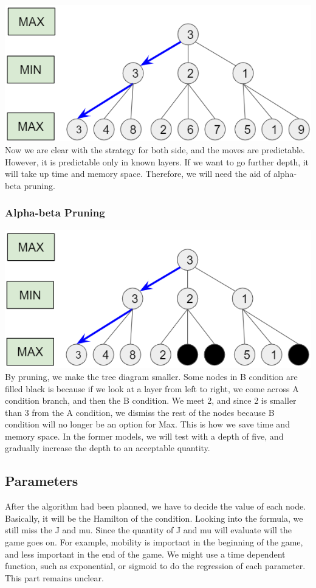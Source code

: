 \documentclass[aps,pra,preprint,amsmath,amssymb,floatfix]{revtex4-2}
\begin{document}
\includegraphics[scale=0.6]{fig/3.png}\\
Now we are clear with the strategy for both side, and the moves are predictable. However, it is predictable only in known layers. If we want to go further depth, it will take up time and memory space. Therefore, we will need the aid of alpha-beta pruning.\\
\subsubsection{Alpha-beta Pruning}
\includegraphics[scale=0.6]{fig/4.png}\\
By pruning, we make the tree diagram smaller. Some nodes in B condition are filled black is because if we look at a layer from left to right, we come across A condition branch, and then the B condition. We meet 2, and since 2 is smaller than 3 from the A condition, we dismiss the rest of the nodes because B condition will no longer be an option for Max. This is how we save time and memory space.
In the former models, we will test with a depth of five, and gradually increase the depth to an acceptable quantity. 

\subsection{Parameters}
After the algorithm had been planned, we have to decide the value of each node. Basically, it will be the Hamilton of the condition. Looking into the formula, we still miss the J and mu. Since the quantity of J and mu will evaluate will the game goes on. For example, mobility is important in the beginning of the game, and less important in the end of the game. We might use a time dependent function, such as exponential, or sigmoid to do the regression of each parameter. This part remains unclear.
\end{document}
